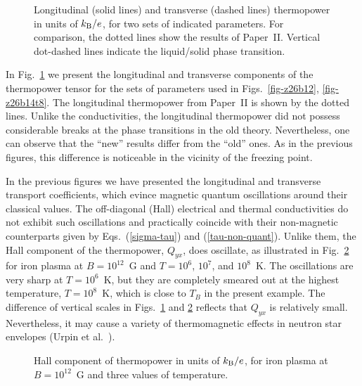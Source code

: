 \documentclass{aa}
\newcommand{\kB}{k_{\rm B}}
\begin{document}
{{\begin{figure}
\begin{center}
 \leavevmode
 \epsfysize=85mm
\end{center}
\caption[]{Longitudinal (solid lines)
and transverse (dashed lines)
thermopower in units of $\kB/e$,
for two sets of indicated parameters.
For comparison, the dotted lines show the
results of Paper~II.
Vertical dot-dashed lines indicate the liquid/solid phase transition.}
\label{fig-Q}
\end{figure}

In Fig.~\ref{fig-Q} we present the
longitudinal and transverse components of the thermopower tensor
for the sets of parameters used in Figs.~\ref{fig-z26b12}, \ref{fig-z26b14t8}.
The longitudinal thermopower from Paper~II is shown by the dotted lines.
Unlike the conductivities, the longitudinal thermopower
did not possess considerable breaks
at the phase transitions in the old theory.
Nevertheless, one can observe that the ``new'' results differ from
the ``old'' ones. As in the previous figures,
this difference is noticeable in the vicinity of the freezing point.

In the previous figures we have presented 
the longitudinal and transverse transport coefficients, which evince
magnetic quantum oscillations around their classical values. 
The off-diagonal (Hall) electrical and thermal conductivities
do not exhibit such oscillations and practically coincide
with their non-magnetic counterparts given by Eqs.~(\ref{sigma-tau}) and 
(\ref{tau-non-quant}). Unlike them, the Hall component
of the thermopower, $Q_{yx}$, does oscillate,
as illustrated in Fig.~\ref{fig-Qhall}
for iron plasma at $B=10^{12}$~G and $T=10^6$, $10^7$,
and $10^8$~K. The oscillations are very sharp at $T=10^6$~K,
but they are completely smeared out 
at the highest temperature, $T=10^8$~K,
which is close to $T_B$ in the present example.
The difference of vertical scales in Figs.~\ref{fig-Q}
and \ref{fig-Qhall}
reflects that $Q_{yx}$ is relatively
small. Nevertheless, it may cause 
a variety of thermomagnetic effects
in neutron star envelopes (Urpin et al.\ \cite{uly86}).

\begin{figure}
\begin{center}
 \leavevmode
 \epsfysize=44mm
\end{center}
\caption[]{Hall component of
thermopower in units of $\kB/e$,
for iron plasma at $B=10^{12}$~G
and three values of temperature.}
\label{fig-Qhall}
\end{figure}

}}
\end{document}

